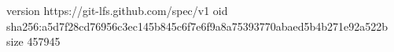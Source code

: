 version https://git-lfs.github.com/spec/v1
oid sha256:a5d7f28cd76956c3ec145b845c6f7e6f9a8a75393770abaed5b4b271e92a522b
size 457945
